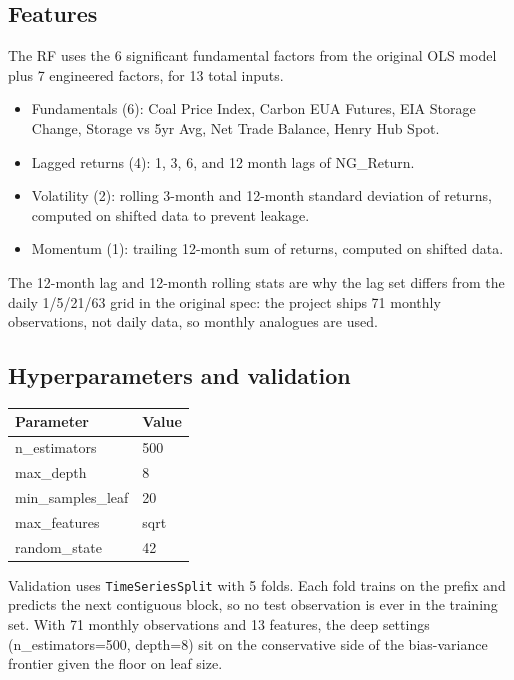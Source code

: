 \documentclass[11pt,letterpaper]{article}
\begin{document}
\subsection{Features}

The RF uses the 6 significant fundamental factors from the original OLS model plus 7 engineered factors, for 13 total inputs.

\begin{itemize}[leftmargin=*,nosep]
  \item Fundamentals (6): Coal Price Index, Carbon EUA Futures, EIA Storage Change, Storage vs 5yr Avg, Net Trade Balance, Henry Hub Spot.
  \item Lagged returns (4): 1, 3, 6, and 12 month lags of NG\_Return.
  \item Volatility (2): rolling 3-month and 12-month standard deviation of returns, computed on shifted data to prevent leakage.
  \item Momentum (1): trailing 12-month sum of returns, computed on shifted data.
\end{itemize}

The 12-month lag and 12-month rolling stats are why the lag set differs from the daily 1/5/21/63 grid in the original spec: the project ships 71 monthly observations, not daily data, so monthly analogues are used.

\subsection{Hyperparameters and validation}

\begin{table}[h]
\centering
\small
\begin{tabular}{ll}
\toprule
Parameter & Value \\
\midrule
n\_estimators & 500 \\
max\_depth & 8 \\
min\_samples\_leaf & 20 \\
max\_features & sqrt \\
random\_state & 42 \\
\bottomrule
\end{tabular}
\end{table}

Validation uses \texttt{TimeSeriesSplit} with 5 folds. Each fold trains on the prefix and predicts the next contiguous block, so no test observation is ever in the training set. With 71 monthly observations and 13 features, the deep settings (n\_estimators=500, depth=8) sit on the conservative side of the bias-variance frontier given the floor on leaf size.
\end{document}

